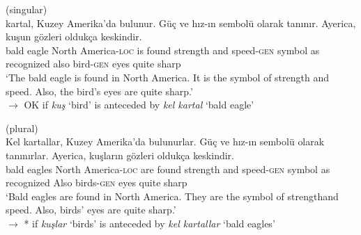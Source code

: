 \documentclass[output=paper,
modfonts
]{langscibook}
\begin{document}
	\ea \label{ex:despic:50}
	 (singular) \\
	 {kartal}, {Kuzey} {Amerika'da} {bulunur}. {G\"u\c c} {ve} {h\i z-\i n}{ sembol\"u} {olarak} {tan\i n\i r}. {Ayerica}, {ku\c sun} {g\"ozleri} {olduk\c ca} {keskindir}. \\
	bald eagle North America-\textsc{loc} {is found} strength and speed-\textsc{gen} symbol as recognized also bird-\textsc{gen} eyes quite sharp \\
	\glt `The bald eagle is found in North America. It is the symbol of strength and speed. Also, the bird's eyes are quite sharp.' \\
	$\rightarrow$ OK if \textit{ku\c s} `bird' is anteceded by \textit{kel kartal} `bald eagle'
	\z 
	
	
	\ea \label{ex:despic:51}
	 (plural) \\
	\gll 
	{Kel} {kartallar}, {Kuzey} {Amerika'da} {bulunurlar}. {G\"u\c c} {ve} {h\i z-\i n} {sembol\"u} {olarak} {tan\i n\i rlar.} {Ayerica}, {ku\c slar\i n} {g\"ozleri} {olduk\c ca} {keskindir}. \\
	bald eagles North America-\textsc{loc} {are found} strength and speed-\textsc{gen} symbol as recognized Also birds-\textsc{gen} eyes quite sharp \\
	\glt `Bald eagles are found in North America. They are the symbol of strength\largerpage[3] and speed. Also, birds' eyes are quite sharp.' \\
	$\rightarrow$ * if \textit{ku\c slar} `birds' is anteceded by \textit{kel kartallar} `bald eagles'
	\z 
	
\end{document}
